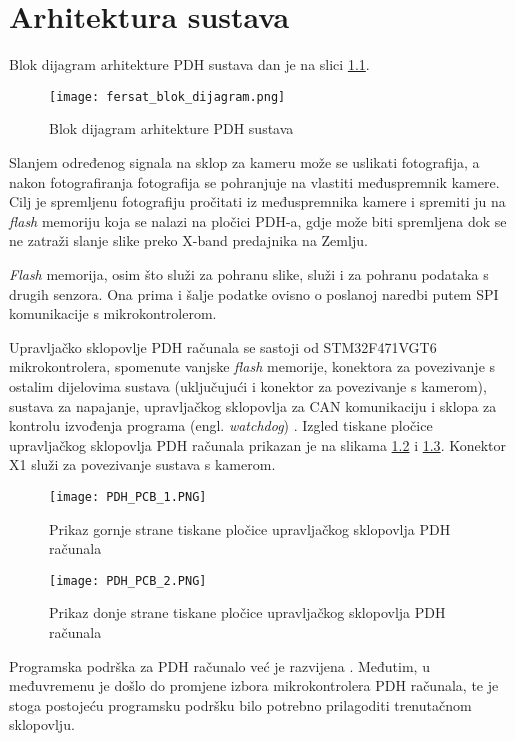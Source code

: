 \chapter{Arhitektura sustava}

Blok dijagram arhitekture PDH sustava dan je na slici \ref{fig:fersat_blok}.

\begin{figure}[H]
	\centering
	\texttt{[image: fersat\_blok\_dijagram.png]}
	\caption{Blok dijagram arhitekture PDH sustava}
	\label{fig:fersat_blok}
\end{figure}

Slanjem određenog signala na sklop za kameru može se uslikati fotografija, a nakon fotografiranja fotografija se pohranjuje na vlastiti međuspremnik kamere. Cilj je spremljenu fotografiju pročitati iz međuspremnika kamere i spremiti ju na \textit{flash} memoriju koja se nalazi na pločici PDH-a, gdje može biti spremljena dok se ne zatraži slanje slike preko X-band predajnika na Zemlju.

\textit{Flash} memorija, osim što služi za pohranu slike, služi i za pohranu podataka s drugih senzora. Ona prima i šalje podatke ovisno o poslanoj naredbi putem SPI komunikacije s mikrokontrolerom.

Upravljačko sklopovlje PDH računala se sastoji od STM32F471VGT6 mikrokontrolera, spomenute vanjske \textit{flash} memorije, konektora za povezivanje s ostalim dijelovima sustava (uključujući i konektor za povezivanje s kamerom), sustava za napajanje, upravljačkog sklopovlja za CAN komunikaciju i sklopa za kontrolu izvođenja programa (engl. \textit{watchdog}) \cite{zavrsni_filip_juric}. Izgled tiskane pločice upravljačkog sklopovlja PDH računala prikazan je na slikama \ref{fig:PDH_PCB_1} i \ref{fig:PDH_PCB_2}. Konektor X1 služi za povezivanje sustava s kamerom.

\begin{figure}[H]
	\centering
	\texttt{[image: PDH\_PCB\_1.PNG]}
	\caption{Prikaz gornje strane tiskane pločice upravljačkog sklopovlja PDH računala \cite{zavrsni_filip_juric}}
	\label{fig:PDH_PCB_1}
\end{figure}

\begin{figure}[H]
	\centering
	\texttt{[image: PDH\_PCB\_2.PNG]}
	\caption{Prikaz donje strane tiskane pločice upravljačkog sklopovlja PDH računala \cite{zavrsni_filip_juric}}
	\label{fig:PDH_PCB_2}
\end{figure}

Programska podrška za PDH računalo već je razvijena \cite{diplomski_goran_petrak}. Međutim, u međuvremenu je došlo do promjene izbora mikrokontrolera PDH računala, te je stoga postojeću programsku podršku bilo potrebno prilagoditi trenutačnom sklopovlju.